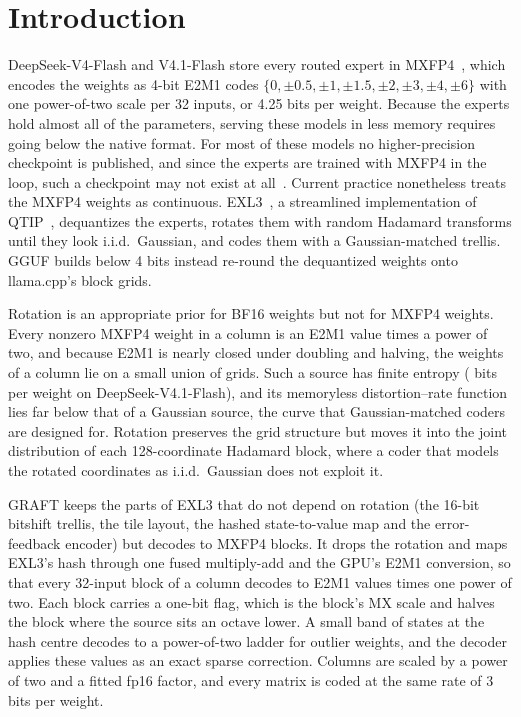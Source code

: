 \section{Introduction}
\label{sec:intro}

DeepSeek-V4-Flash and V4.1-Flash store every routed expert in MXFP4~\citep{rouhani2023mx,deepseekv4}, which encodes
the weights as 4-bit E2M1 codes $\{0,\pm0.5,\pm1,\pm1.5,\pm2,\pm3,\pm4,\pm6\}$ with one power-of-two scale per 32
inputs, or 4.25 bits per weight. Because the experts hold almost all of the parameters, serving these models in less
memory requires going below the native format. For most of these models no higher-precision checkpoint is published,
and since the experts are trained with MXFP4 in the loop, such a checkpoint may not exist at
all~\citep{deepseekv4,kimik3,mimov25fp4}. Current practice nonetheless treats the MXFP4 weights as continuous.
EXL3~\citep{exllamav3}, a streamlined implementation of QTIP~\citep{tseng2024qtip}, dequantizes the experts, rotates
them with random Hadamard transforms until they look i.i.d.\ Gaussian, and codes them with a Gaussian-matched trellis.
GGUF builds below 4 bits instead re-round the dequantized weights onto llama.cpp's block grids.

Rotation is an appropriate prior for BF16 weights but not for MXFP4 weights. Every nonzero MXFP4 weight in a column
is an E2M1 value times a power of two, and because E2M1 is nearly closed under doubling and halving, the weights of a
column lie on a small union of grids. Such a source has finite entropy ( bits per weight on
DeepSeek-V4.1-Flash), and its memoryless distortion--rate function lies far below that of a Gaussian source, the
curve that Gaussian-matched coders are designed for. Rotation preserves the grid structure but moves it into the joint
distribution of each 128-coordinate Hadamard block, where a coder that models the rotated coordinates as i.i.d.\
Gaussian does not exploit it.

GRAFT keeps the parts of EXL3 that do not depend on rotation (the 16-bit bitshift trellis, the tile layout, the
hashed state-to-value map and the error-feedback encoder) but decodes to MXFP4 blocks. It drops the rotation
and maps EXL3's hash through one fused multiply-add and the GPU's E2M1 conversion, so that every 32-input block of a
column decodes to E2M1 values times one power of two. Each block carries a one-bit flag, which is the block's MX scale
and halves the block where the source sits an octave lower. A small band of states at the hash centre decodes to a
power-of-two ladder for outlier weights, and the decoder applies these values as an exact sparse correction. Columns
are scaled by a power of two and a fitted fp16 factor, and every matrix is coded at the same rate of 3 bits per
weight.

